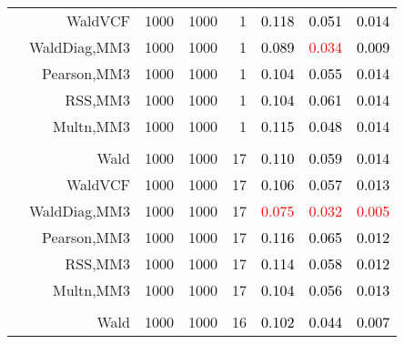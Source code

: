 \documentclass[
]{article}
\begin{document}
\begin{table}[H]
{\begin{tabular}[t]{lrrrrrrr}
\hspace{1em} & WaldVCF & 1000 & 1000 & 1 & \textcolor{black}{0.118} & \textcolor{black}{0.051} & \textcolor{black}{0.014}\\

\hspace{1em} & WaldDiag,MM3 & 1000 & 1000 & 1 & \textcolor{black}{0.089} & \textcolor{red}{0.034} & \textcolor{black}{0.009}\\

\hspace{1em} & Pearson,MM3 & 1000 & 1000 & 1 & \textcolor{black}{0.104} & \textcolor{black}{0.055} & \textcolor{black}{0.014}\\

\hspace{1em} & RSS,MM3 & 1000 & 1000 & 1 & \textcolor{black}{0.104} & \textcolor{black}{0.061} & \textcolor{black}{0.014}\\

\hspace{1em} & Multn,MM3 & 1000 & 1000 & 1 & \textcolor{black}{0.115} & \textcolor{black}{0.048} & \textcolor{black}{0.014}\\
\cmidrule{1-8}
\addlinespace[0.3em]
\multicolumn{8}{l}{\textbf{1F 15V}}\\
\hspace{1em} & Wald & 1000 & 1000 & 17 & \textcolor{black}{0.110} & \textcolor{black}{0.059} & \textcolor{black}{0.014}\\

\hspace{1em} & WaldVCF & 1000 & 1000 & 17 & \textcolor{black}{0.106} & \textcolor{black}{0.057} & \textcolor{black}{0.013}\\

\hspace{1em} & WaldDiag,MM3 & 1000 & 1000 & 17 & \textcolor{red}{0.075} & \textcolor{red}{0.032} & \textcolor{red}{0.005}\\

\hspace{1em} & Pearson,MM3 & 1000 & 1000 & 17 & \textcolor{black}{0.116} & \textcolor{black}{0.065} & \textcolor{black}{0.012}\\

\hspace{1em} & RSS,MM3 & 1000 & 1000 & 17 & \textcolor{black}{0.114} & \textcolor{black}{0.058} & \textcolor{black}{0.012}\\

\hspace{1em} & Multn,MM3 & 1000 & 1000 & 17 & \textcolor{black}{0.104} & \textcolor{black}{0.056} & \textcolor{black}{0.013}\\
\cmidrule{1-8}
\addlinespace[0.3em]
\multicolumn{8}{l}{\textbf{2F 10V}}\\
\hspace{1em} & Wald & 1000 & 1000 & 16 & \textcolor{black}{0.102} & \textcolor{black}{0.044} & \textcolor{black}{0.007}\\


\end{tabular}}
\end{table}
\end{document}
